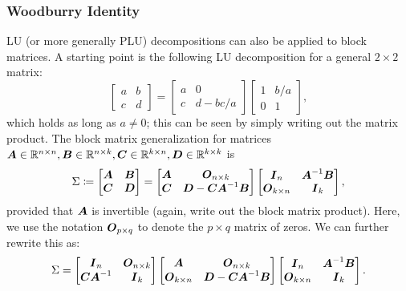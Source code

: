 \subsubsection{Woodburry Identity}
LU (or more generally PLU) decompositions can also be applied to block matrices. A starting point is the following LU decomposition for a general \(2 \times 2\) matrix:
\begin{equation*}
	\begin{bmatrix}
		a & b \\
		c & d
	\end{bmatrix}
	=
	\begin{bmatrix}
		a & 0        \\
		c & d - bc/a
	\end{bmatrix}
	\begin{bmatrix}
		1 & b/a \\
		0 & 1
	\end{bmatrix},
\end{equation*}
which holds as long as \(a \ne 0\); this can be seen by simply writing out the matrix product. The block matrix generalization for matrices \(\boldsymbol{A} \in \mathbb{R}^{n \times n}, \boldsymbol{B} \in \mathbb{R}^{n \times k}, \boldsymbol{C} \in \mathbb{R}^{k \times n}, \boldsymbol{D} \in \mathbb{R}^{k \times k}\) is
\begin{equation} \label{eq:BlockLU}
	\Sigma \coloneqq \begin{bmatrix}
		\boldsymbol{A} & \boldsymbol{B} \\
		\boldsymbol{C} & \boldsymbol{D}
	\end{bmatrix}
	=
	\begin{bmatrix}
		\boldsymbol{A} & \boldsymbol{O}_{n \times k}                      \\
		\boldsymbol{C} & \boldsymbol{D} - \boldsymbol{C} \boldsymbol{A}^{-1} \boldsymbol{B}
	\end{bmatrix}
	\begin{bmatrix}
		\boldsymbol{I}_n            & \boldsymbol{A}^{-1} \boldsymbol{B} \\
		\boldsymbol{O}_{k \times n} & \boldsymbol{I}_k
	\end{bmatrix},
\end{equation}
provided that \(\boldsymbol{A}\) is invertible (again, write out the block matrix product). Here, we use the notation \(\boldsymbol{O}_{p \times q}\) to denote the \(p \times q\) matrix of zeros. We can further rewrite this as:
\begin{equation*}
	\Sigma =
	\begin{bmatrix}
		\boldsymbol{I}_n             & \boldsymbol{O}_{n \times k} \\
		\boldsymbol{C} \boldsymbol{A}^{-1} & \boldsymbol{I}_k
	\end{bmatrix}
	\begin{bmatrix}
		\boldsymbol{A}              & \boldsymbol{O}_{n \times k}                      \\
		\boldsymbol{O}_{k \times n} & \boldsymbol{D} - \boldsymbol{C} \boldsymbol{A}^{-1} \boldsymbol{B}
	\end{bmatrix}
	\begin{bmatrix}
		\boldsymbol{I}_n            & \boldsymbol{A}^{-1} \boldsymbol{B} \\
		\boldsymbol{O}_{k \times n} & \boldsymbol{I}_k
	\end{bmatrix}.
\end{equation*}
